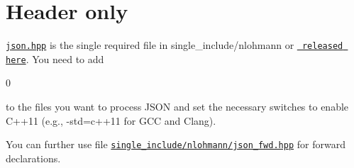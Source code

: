 \chapter{Header only}
\hypertarget{md_build_2dt__core_2__deps_2nlohmann__json-src_2docs_2mkdocs_2docs_2integration_2index}{}\label{md_build_2dt__core_2__deps_2nlohmann__json-src_2docs_2mkdocs_2docs_2integration_2index}
\label{md_build_2dt__core_2__deps_2nlohmann__json-src_2docs_2mkdocs_2docs_2integration_2index_autotoc_md1726}%
%
 \href{https://github.com/nlohmann/json/blob/develop/single_include/nlohmann/json.hpp}{\texttt{ {\ttfamily json.\+hpp}}} is the single required file in {\ttfamily single\+\_\+include/nlohmann} or \href{https://github.com/nlohmann/json/releases}{\texttt{ released here}}. You need to add


\begin{DoxyCode}{0}
\DoxyCodeLine{\textcolor{preprocessor}{\#include\ <nlohmann/json.hpp>}}
\DoxyCodeLine{}
\DoxyCodeLine{\textcolor{comment}{//\ for\ convenience}}

\end{DoxyCode}


to the files you want to process JSON and set the necessary switches to enable C++11 (e.\+g., {\ttfamily -\/std=c++11} for GCC and Clang).

You can further use file \href{https://github.com/nlohmann/json/blob/develop/single_include/nlohmann/json_fwd.hpp}{\texttt{ {\ttfamily single\+\_\+include/nlohmann/json\+\_\+fwd.\+hpp}}} for forward declarations. 